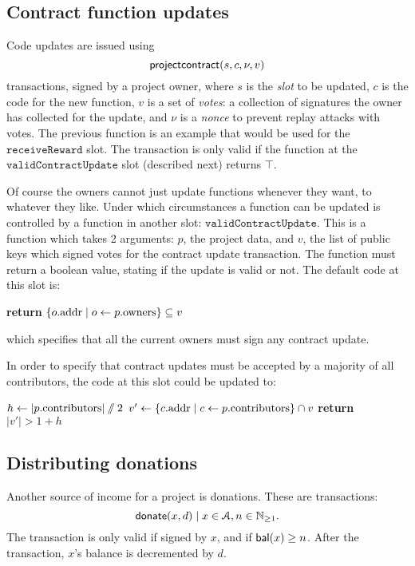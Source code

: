 \subsection{Contract function updates}

Code updates are issued using
\[
    \mathsf{projectcontract}\lparen s, c, \nu, v\rparen
\]
transactions, signed by a project owner, where $s$ is the \emph{slot} to be
updated, $c$ is the code for the new function, $v$ is a set of \emph{votes}: a
collection of signatures the owner has collected for the update, and $\nu$ is a
\emph{nonce} to prevent replay attacks with votes. The previous function is an
example that would be used for the $\mathtt{receiveReward}$ slot. The
transaction is only valid if the function at the $\mathtt{validContractUpdate}$
slot (described next) returns $\top$.

Of course the owners cannot just update functions whenever they want, to
whatever they like. Under which circumstances a function can be updated is
controlled by a function in another slot: $\mathtt{validContractUpdate}$. This
is a function which takes 2 arguments: $p$, the project data, and $v$, the list
of public keys which signed votes for the contract update transaction. The
function must return a boolean value, stating if the update is valid or not. The
default code at this slot is:
\begin{algorithmic}[0]
        \State \textbf{return} $\{ o.{\mathrm{addr}} \mid o \gets p.{\mathrm{owners}} \} \subseteq v$
    \EndProcedure
\end{algorithmic}
which specifies that all the current owners must sign any contract update.

In order to specify that contract updates must be accepted by a majority of all
contributors, the code at this slot could be updated to:
\medskip
\begin{algorithmic}[0]
        \State $h \gets |p.{\mathrm{contributors}}| \sslash 2$
        \State $v' \gets \{ c.{\mathrm{addr}} \mid c \gets p.{\mathrm{contributors}} \} \cap v$
        \State \textbf{return} $|v'| > 1 + h$
    \EndProcedure
\end{algorithmic}

\subsection{Distributing donations}

Another source of income for a project is donations. These are transactions:
\[
\mathsf{donate}\lparen x, d\rparen \mid x \in \mathcal{A}, n \in \mathbb{N}_{\geq 1}.
\]
The transaction is only valid if signed by $x$, and if $\mathsf{bal}(x) \geq n$. After
the transaction, $x$'s balance is decremented by $d$.

